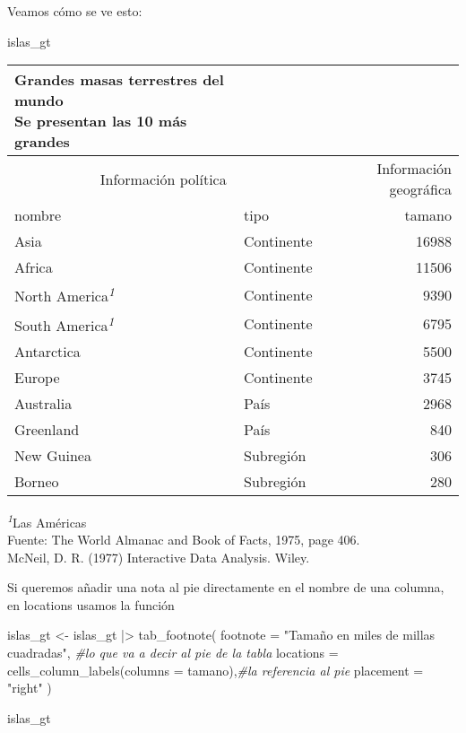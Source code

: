 \documentclass[
]{article}
\newenvironment{Shaded}{\begin{snugshade}}{\end{snugshade}}
\newcommand{\AttributeTok}[1]{\textcolor[rgb]{0.77,0.63,0.00}{#1}}
\newcommand{\CommentTok}[1]{\textcolor[rgb]{0.56,0.35,0.01}{\textit{#1}}}
\newcommand{\FunctionTok}[1]{\textcolor[rgb]{0.00,0.00,0.00}{#1}}
\newcommand{\NormalTok}[1]{#1}
\newcommand{\OtherTok}[1]{\textcolor[rgb]{0.56,0.35,0.01}{#1}}
\newcommand{\SpecialCharTok}[1]{\textcolor[rgb]{0.00,0.00,0.00}{#1}}
\newcommand{\StringTok}[1]{\textcolor[rgb]{0.31,0.60,0.02}{#1}}
\begin{document}
Veamos cómo se ve esto:

\begin{Shaded}
\begin{Highlighting}[]
\NormalTok{islas\_gt}
\end{Highlighting}
\end{Shaded}

\setlength{\LTpost}{0mm}
\begin{longtable}{llr}
\caption*{
{\large Grandes masas terrestres del mundo} \\ 
{\small Se presentan las 10 más grandes}
} \\ 
\toprule
\multicolumn{2}{c}{Información política} & Información geográfica \\ 
\cmidrule(lr){1-2} \cmidrule(lr){3-3}
nombre & tipo & tamano \\ 
\midrule
Asia & Continente & 16988 \\ 
Africa & Continente & 11506 \\ 
North America\textsuperscript{\textit{1}} & Continente & 9390 \\ 
South America\textsuperscript{\textit{1}} & Continente & 6795 \\ 
Antarctica & Continente & 5500 \\ 
Europe & Continente & 3745 \\ 
Australia & País & 2968 \\ 
Greenland & País & 840 \\ 
New Guinea & Subregión & 306 \\ 
Borneo & Subregión & 280 \\ 
\bottomrule
\end{longtable}
\begin{minipage}{\linewidth}
\textsuperscript{\textit{1}}Las Américas\\
Fuente: The World Almanac and Book of Facts, 1975, page 406.\\
McNeil, D. R. (1977) Interactive Data Analysis. Wiley.\\
\end{minipage}

Si queremos añadir una nota al pie directamente en el nombre de una
columna, en locations usamos la función

\begin{Shaded}
\begin{Highlighting}[]
\NormalTok{islas\_gt }\OtherTok{\textless{}{-}}\NormalTok{ islas\_gt }\SpecialCharTok{|\textgreater{}}   
  \FunctionTok{tab\_footnote}\NormalTok{(}
    \AttributeTok{footnote =} \StringTok{"Tamaño en miles de millas cuadradas"}\NormalTok{, }\CommentTok{\#lo que va a decir al pie de la tabla}
    \AttributeTok{locations =} \FunctionTok{cells\_column\_labels}\NormalTok{(}\AttributeTok{columns =}\NormalTok{ tamano),}\CommentTok{\#la referencia al pie}
    \AttributeTok{placement =} \StringTok{"right"}
\NormalTok{  )}

\NormalTok{islas\_gt}
\end{Highlighting}
\end{Shaded}
\end{document}
